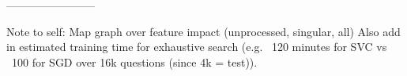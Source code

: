 ------------------------

Note to self: Map graph over feature impact (unprocessed, singular, all)
Also add in estimated training time for exhaustive search (e.g. ~120 minutes for SVC vs ~100 for SGD over 16k questions (since 4k = test)). 


\begin{comment}
I can either use \verb|\cite{ChangLin2011}| and get: \cite{ChangLin2011}. \\
Or I can use \verb|\citet{ChangLin2011}| and get: \citet{ChangLin2011}. \\
\verb|\cite| is based on \verb|\renewcommand*{\cite}{\autocite}|, \\
and \verb|\citet| is based on \verb|\newcommand{\citet}{\textcite}|. \\
Unfortunately, you can't get the year, but at least you can now get in-text citation. 
\end{comment}

